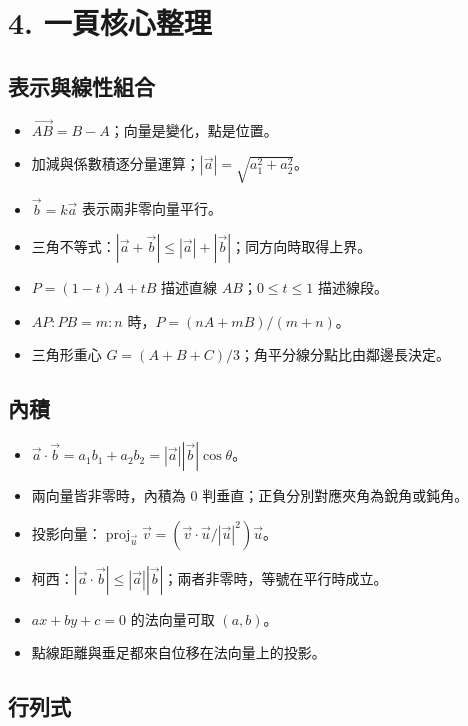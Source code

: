 \documentclass[11pt,a4paper]{article}
\providecommand{\tightlist}{%
  \setlength{\itemsep}{0pt}\setlength{\parskip}{0pt}}
\begin{document}
\section{4. 一頁核心整理}\label{ux4e00ux9801ux6838ux5fc3ux6574ux7406}

\subsection{表示與線性組合}\label{ux8868ux793aux8207ux7ddaux6027ux7d44ux5408}

\begin{itemize}
\tightlist
\item
  \(\overrightarrow{AB}=B-A\)；向量是變化，點是位置。
\item
  加減與係數積逐分量運算；\(|\vec a|=\sqrt{a_1^2+a_2^2}\)。
\item
  \(\vec b=k\vec a\) 表示兩非零向量平行。
\item
  三角不等式：\(|\vec a+\vec b|\le|\vec a|+|\vec b|\)；同方向時取得上界。
\item
  \(P=(1-t)A+tB\) 描述直線 \(AB\)；\(0\le t\le1\) 描述線段。
\item
  \(AP:PB=m:n\) 時，\(P=(nA+mB)/(m+n)\)。
\item
  三角形重心 \(G=(A+B+C)/3\)；角平分線分點比由鄰邊長決定。
\end{itemize}

\subsection{內積}\label{ux5167ux7a4d}

\begin{itemize}
\tightlist
\item
  \(\vec a\cdot\vec b=a_1b_1+a_2b_2=|\vec a||\vec b|\cos\theta\)。
\item
  兩向量皆非零時，內積為 \(0\) 判垂直；正負分別對應夾角為銳角或鈍角。
\item
  投影向量：\(\operatorname{proj}_{\vec u}\vec v=(\vec v\cdot\vec u/|\vec u|^2)\vec u\)。
\item
  柯西：\(|\vec a\cdot\vec b|\le|\vec a||\vec b|\)；兩者非零時，等號在平行時成立。
\item
  \(ax+by+c=0\) 的法向量可取 \((a,b)\)。
\item
  點線距離與垂足都來自位移在法向量上的投影。
\end{itemize}

\subsection{行列式}\label{ux884cux5217ux5f0f}
\end{document}
